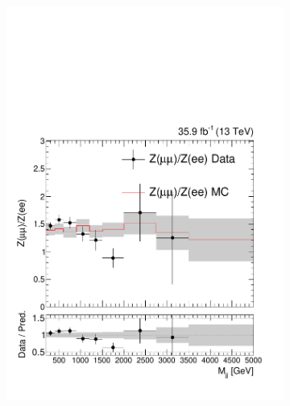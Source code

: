 \begin{figure}[]
    \begin{center}
        \begin{subfigure}[t]{0.32\textwidth}
            \includegraphics[width=\textwidth]{figures/vbf/fits/dimuon_dielectron_cat_vbf_ratio.pdf}
        \end{subfigure}
        \begin{subfigure}[t]{0.32\textwidth}

\end{subfigure}
\end{center}
\end{figure}
